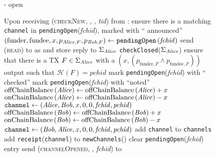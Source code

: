 \begin{figure}[H]
\begin{systembox}{\fpaynet - open}
\begin{algorithmic}[1]
        \State Upon receiving (\textsc{checkNew}, \alice, \bob, \textit{tid})
        from \alice:
        \Indent
          \State ensure there is a matching \texttt{channel} in
          \texttt{pendingOpen}(\textit{fchid}), marked with ``\alice{}
          announced''
          \label{alg:fpaynet:checkNew:valid}
          \State $\left(\mathrm{funder}, \mathrm{fundee}, x, p_{\mathit{Alice}, F},
          p_{\mathit{Bob}, F}\right) \gets
          \mathtt{pendingOpen}\left(\mathit{fchid}\right)$
          \State send (\textsc{read}) to \ledger{} as \alice{} and store reply
          to $\Sigma_{\mathit{Alice}}$
          \State \texttt{checkClosed}($\Sigma_{\mathit{Alice}}$)
          \label{alg:fpaynet:checkNew:read}
          \State ensure that there is a TX $F \in \Sigma_{\mathit{Alice}}$ with a
          $\left(x, \left(p_{\mathrm{funder}, F} \wedge p_{\mathrm{fundee},
          F}\right)\right)$ output such that $\mathcal{H}\left(F\right) =
          \mathit{pchid}$
          \label{alg:fpaynet:checkNew:included}
          \State mark \texttt{pendingOpen}(\textit{fchid}) with ``\alice{}
          checked''
          \label{alg:fpaynet:checkNew:mark}
            \State mark \texttt{pendingOpen}(\textit{fchid}) with ``noted''
              \State $\mathrm{offChainBalance}\left(\mathit{Alice}\right) \gets
              \mathrm{offChainBalance}\left(\mathit{Alice}\right) + x$ 
              \State $\mathrm{onChainBalance}\left(\mathit{Alice}\right) \gets
              \mathrm{offChainBalance}\left(\mathit{Alice}\right) - x$
              \State $\mathtt{channel} \gets \left(\mathit{Alice}, \mathit{Bob}, x, 0, 0,
              \mathit{fchid}, \mathit{pchid}\right)$
            \Else {}
              \State $\mathrm{offChainBalance}\left(\mathit{Bob}\right) \gets
              \mathrm{offChainBalance}\left(\mathit{Bob}\right) + x$ 
              \State $\mathrm{onChainBalance}\left(\mathit{Bob}\right) \gets
              \mathrm{offChainBalance}\left(\mathit{Bob}\right) - x$
              \State $\mathtt{channel} \gets \left(\mathit{Bob}, \mathit{Alice}, x, 0, 0,
              \mathit{fchid}, \mathit{pchid}\right)$
            \EndIf
            \State add \texttt{channel} to \texttt{channels}
          \EndIf
          \State add \texttt{receipt}(\texttt{channel}) to
          \texttt{newChannels}(\alice)
            \State clear \texttt{pendingOpen}(\textit{fchid}) entry
          \EndIf
          \State send (\textsc{channelOpened}, \alice, \textit{fchid}) to
          \simulator
          \label{alg:fpaynet:checkNew:sim}
        \EndIndent
      \end{algorithmic}
    \end{systembox}
    \caption{}
    \label{alg:fpaynet:open}
  \end{figure}

